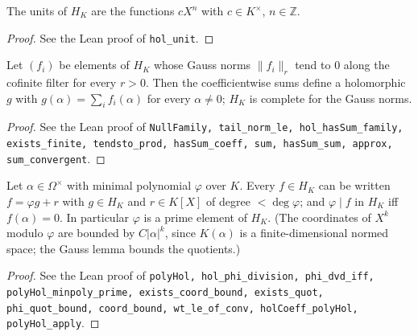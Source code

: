 \begin{corollary}[Units of $H_K$]
\label{cor:hol-units}
\leanok
The units of $H_K$ are the functions $cX^n$ with $c\in K^\times$, $n\in\mathbb Z$.
\end{corollary}
\begin{proof}
\leanok
See the Lean proof of \texttt{hol\_unit}.
\end{proof}

\begin{proposition}
\label{prop:null-family-sum}
\leanok
Let $(f_i)$ be elements of $H_K$ whose Gauss norms $\|f_i\|_r$ tend to $0$ along the cofinite filter for every $r>0$. Then the coefficientwise sums define a holomorphic $g$ with $g(\alpha)=\sum_if_i(\alpha)$ for every $\alpha\neq0$; $H_K$ is complete for the Gauss norms.
\end{proposition}
\begin{proof}
\leanok
See the Lean proof of \texttt{NullFamily, tail\_norm\_le, hol\_hasSum\_family, exists\_finite, tendsto\_prod, hasSum\_coeff, sum, hasSum\_sum, approx, sum\_convergent}.
\end{proof}

\begin{proposition}
\label{prop:phi-division}
\leanok
Let $\alpha\in\Omega^\times$ with minimal polynomial $\varphi$ over $K$. Every $f\in H_K$ can be written $f=\varphi g+r$ with $g\in H_K$ and $r\in K[X]$ of degree $<\deg\varphi$; and $\varphi\mid f$ in $H_K$ iff $f(\alpha)=0$. In particular $\varphi$ is a prime element of $H_K$. (The coordinates of $X^k$ modulo $\varphi$ are bounded by $C|\alpha|^k$, since $K(\alpha)$ is a finite-dimensional normed space; the Gauss lemma bounds the quotients.)
\end{proposition}
\begin{proof}
\leanok
See the Lean proof of \texttt{polyHol, hol\_phi\_division, phi\_dvd\_iff, polyHol\_minpoly\_prime, exists\_coord\_bound, exists\_quot, phi\_quot\_bound, coord\_bound, wt\_le\_of\_conv, holCoeff\_polyHol, polyHol\_apply}.
\end{proof}

